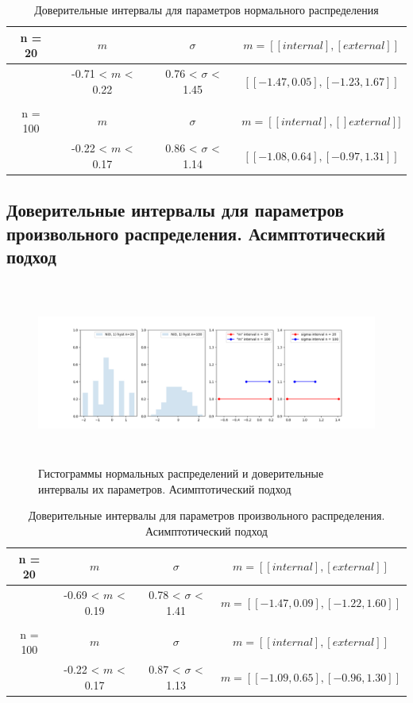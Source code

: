 \documentclass[a4paper,14pt]{article}
\begin{document}
	
	\begin{table}[H]
		\centering
		\begin{tabular}{| c | c | c | c |}
			\hline
			n = 20   &  $m$  & $\sigma$ & $m = [[internal], [external]]$\\ \hline
			&  -0.71 < $m$ < 0.22 & 0.76 < $\sigma$ < 1.45 & $[[-1.47, 0.05], [-1.23, 1.67]]$\\ \hline
			&   &   & \\ \hline
			n = 100   &  $m$  & $\sigma$ & $m = [[internal], []external]]$\\ \hline
			& -0.22 < $m$ < 0.17 & 0.86 < $\sigma$ < 1.14 & $[[-1.08, 0.64], [-0.97, 1.31]]$ \\
			\hline
		\end{tabular}
		\caption{Доверительные интервалы для параметров нормального распределения}
		\label{tab:interv_simple}
	\end{table}
	
	\subsection{Доверительные интервалы для параметров произвольного распределения. Асимптотический подход}
	\begin{figure}[H]
		\centering
		\includegraphics[width = 20cm, height = 6cm]{../image/lab8_2.png}
		\caption{Гистограммы нормальных распределений и доверительные интервалы их параметров. Асимптотический подход}
		\label{w_pert}
	\end{figure}
	
	\begin{table}[H]
		\centering
		\begin{tabular}{| c | c | c | c |}
			\hline
			n = 20   &  $m$  & $\sigma$ & $m = [[internal], [external]]$\\ \hline
			&  -0.69 < $m$ < 0.19 & 0.78 < $\sigma$ < 1.41 & $m = [[-1.47, 0.09], [-1.22, 1.60]]$\\ \hline
			&   &   & \\ \hline
			n = 100   &  $m$  & $\sigma$ & $m = [[internal], [external]]$\\ \hline
			& -0.22 < $m$ < 0.17 & 0.87 < $\sigma$ < 1.13 & $m = [[-1.09, 0.65], [-0.96, 1.30]]$\\
			\hline
		\end{tabular}
		\caption{Доверительные интервалы для параметров произвольного распределения. Асимптотический подход}
		\label{tab:interv_asimpt}
	\end{table}
	
\end{document}
